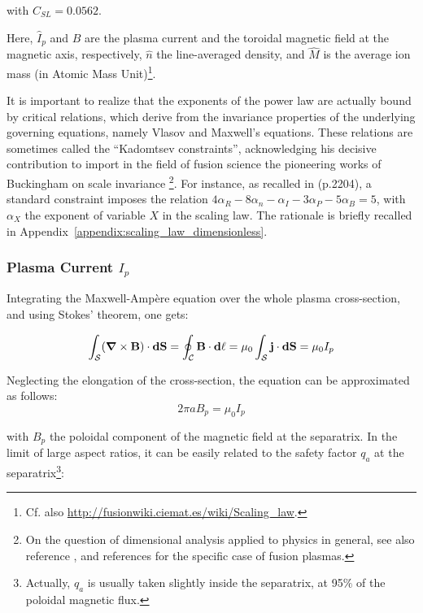 \noindent
with $C_{SL} = 0.0562$.


Here, $\hat I_p$ and $B$ are the plasma current and the toroidal magnetic field at the magnetic axis, respectively, $\hat n$ the line-averaged density, and $\hat M$ is the average ion mass (in Atomic Mass Unit)\footnote{Cf. also \url{http://fusionwiki.ciemat.es/wiki/Scaling_law}.}. 


It is important to realize that the exponents of the power law are actually bound by critical relations, which derive from the invariance properties of the underlying governing equations, namely Vlasov and Maxwell's equations. These relations are sometimes called the ``Kadomtsev constraints'', acknowledging his decisive contribution \cite{Kadomtsev1975} to import in the field of fusion science the pioneering works of Buckingham on scale invariance \cite{Buckingham1914}\footnote{On the question of dimensional analysis applied to physics in general, see also reference \cite{Misic2010}, and references \cite{Connor1977, Luce2008} for the specific case of fusion plasmas.}. For instance, as recalled in \cite{ITERphysics_chap2} (p.2204), a standard constraint imposes the relation 
$4\alpha_R - 8\alpha_n - \alpha_I - 3\alpha_P - 5\alpha_B = 5$, with $\alpha_X$ the exponent of variable $X$ in the scaling law. The rationale is briefly recalled in Appendix~\ref{appendix:scaling_law_dimensionless}.

\subsubsection{Plasma Current $I_p$}

Integrating the Maxwell-Ampère equation over the whole plasma cross-section, and using Stokes' theorem, one gets:

\begin{equation*}
\int_\mathcal{S} (\mbox{\boldmath${\nabla}$}\times {\mathbf B}) \cdot \mathbf{dS} = 
\oint_\mathcal{C} \mathbf{B} \cdot \mathbf{d\ell}
= \mu_0 \int_\mathcal{S} {\mathbf j} \cdot \mathbf{dS} = \mu_0 I_p
\end{equation*}

Neglecting the elongation of the cross-section, the equation can be approximated as follows:
$$
2\pi a B_p = \mu_0 I_p
$$

\noindent
with $B_p$ the poloidal component of the magnetic field at the separatrix. In the limit of large aspect ratios, it can be easily related to the safety factor $q_a$ at the separatrix\footnote{Actually, $q_a$ is usually taken slightly inside the separatrix, at 95$\%$ of the poloidal magnetic flux.}:

